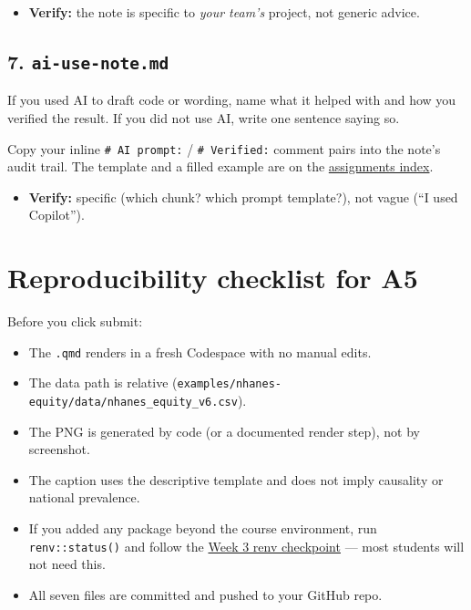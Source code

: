 \documentclass[
  letterpaper,
  DIV=11,
  numbers=noendperiod,
  oneside]{scrreprt}
\providecommand{\tightlist}{%
  \setlength{\itemsep}{0pt}\setlength{\parskip}{0pt}}
\begin{document}
\begin{itemize}
\tightlist
\item
  \textbf{Verify:} the note is specific to \emph{your team's} project,
  not generic advice.
\end{itemize}

\subsection*{\texorpdfstring{7.
\texttt{ai-use-note.md}}{7. ai-use-note.md}}\label{ai-use-note.md}

If you used AI to draft code or wording, name what it helped with and
how you verified the result. If you did not use AI, write one sentence
saying so.

Copy your inline \texttt{\#\ AI\ prompt:} / \texttt{\#\ Verified:}
comment pairs into the note's audit trail. The template and a filled
example are on the
\hyperref[the-official-ai-documentation-rule]{assignments index}.

\begin{itemize}
\tightlist
\item
  \textbf{Verify:} specific (which chunk? which prompt template?), not
  vague (``I used Copilot'').
\end{itemize}

\section*{Reproducibility checklist for
A5}\label{reproducibility-checklist-for-a5}


Before you click submit:

\begin{itemize}
\tightlist
\item
  The \texttt{.qmd} renders in a fresh Codespace with no manual edits.
\item
  The data path is relative
  (\texttt{examples/nhanes-equity/data/nhanes\_equity\_v6.csv}).
\item
  The PNG is generated by code (or a documented render step), not by
  screenshot.
\item
  The caption uses the descriptive template and does not imply causality
  or national prevalence.
\item
  If you added any package beyond the course environment, run
  \texttt{renv::status()} and follow the
  \hyperref[minimal-renv-checkpoint]{Week 3 renv checkpoint} --- most
  students will not need this.
\item
  All seven files are committed and pushed to your GitHub repo.
\end{itemize}
\end{document}
